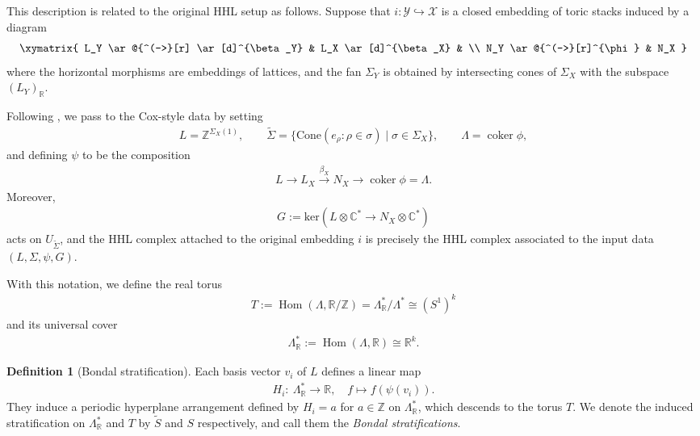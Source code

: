 \documentclass[11pt,reqno]{amsart}
\def\C {{\mathbb C}}
\def\R {{\mathbb R}}
\def\Z {{\mathbb Z}}
\theoremstyle{definition}
\newtheorem{definition}[theorem]{Definition}
\numberwithin{equation}{section}
\begin{document}
\smallskip



This description is related to the original HHL setup as follows. Suppose that $i:\mathcal{Y}\hookrightarrow\mathcal{X}$ is a closed embedding of toric stacks induced by a diagram
\begin{align*}
    \xymatrix{
        L_Y \ar@{^(->}[r] \ar[d]^{\beta_Y} & L_X \ar[d]^{\beta_X} & \\
        N_Y \ar@{^(->}[r]^{\phi} & N_X 
    }
\end{align*}
where the horizontal morphisms are embeddings of lattices, and the fan $\Sigma_{Y}$ is obtained by intersecting cones of $\Sigma_X$ with the subspace $(L_Y)_{\mathbb{R}}$. 

\smallskip



Following \cite[\S 3]{BH}, we pass to the Cox-style data by setting
\begin{align*}
    L=\mathbb{Z}^{\Sigma_X(1)},\qquad
\widetilde{\Sigma}=\{\mathrm{Cone}(e_\rho:\rho\in\sigma)\mid \sigma\in \Sigma_X\},\qquad
\Lambda=\operatorname{coker}\phi,
\end{align*}
and defining $\psi$ to be the composition
\begin{align*}
    L \rightarrow L_X \xrightarrow{\beta_X} N_X \rightarrow \operatorname{coker}\phi=\Lambda.
\end{align*}
Moreover,
\begin{align*}
    G:=\mathrm{ker}(L\otimes\C^* \to N_X\otimes\C^*)
\end{align*}
acts on $U_{\widetilde{\Sigma}}$, and the HHL complex attached to the original embedding $i$ is precisely the HHL complex associated to the input data $(L,\Sigma,\psi,G)$.

\smallskip



With this notation, we define the real torus
\begin{align*}
    T:=\operatorname{Hom}(\Lambda,\mathbb{R}/\mathbb{Z})
      =\Lambda_{\mathbb{R}}^*/\Lambda^*
      \cong (S^1)^k
\end{align*}
and its universal cover
\begin{align*}
    \Lambda_{\mathbb{R}}^*:=\operatorname{Hom}(\Lambda,\mathbb{R})\cong \mathbb{R}^k.
\end{align*}


\smallskip





\begin{definition}[Bondal stratification]\label{def:Bondal-stratification}
    Each basis vector $v_i$ of $L$ defines a linear map
\begin{align*}
    H_{i}:\ \Lambda^*_{\R} \rightarrow\R,\quad f\mapsto f(\psi(v_i)).
\end{align*}
They induce a periodic hyperplane arrangement defined by $H_i = a$ for $a\in \Z$ on $\Lambda^*_{\R}$, which descends to the torus $T$. We denote the induced stratification on $\Lambda^*_{\R}$ and $T$ by $\widetilde{S}$ and $S$ respectively, and call them the \textit{Bondal stratifications}.
\end{definition}
\end{document}
